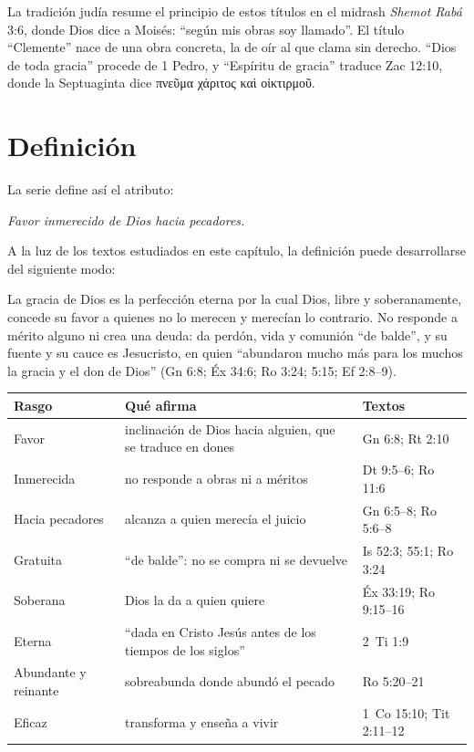 \documentclass[11pt,letterpaper]{article}
\newcommand{\grc}[1]{\foreignlanguage{ancientgreek}{#1}}
\begin{document}
\begin{nota}[Precisión]
La tradición judía resume el principio de estos títulos en el midrash \emph{Shemot Rabá} 3:6, donde Dios dice a Moisés: ``según mis obras soy llamado''. El título ``Clemente'' nace de una obra concreta, la de oír al que clama sin derecho. ``Dios de toda gracia'' procede de 1 Pedro, y ``Espíritu de gracia'' traduce Zac 12:10, donde la Septuaginta dice \grc{πνεῦμα χάριτος καὶ οἰκτιρμοῦ}.
\end{nota}

\section{Definición}

La serie define así el atributo:

\begin{tcolorbox}[colback=papiro,colframe=dorado,boxrule=1.2pt,arc=3pt]
\centering\large\itshape Favor inmerecido de Dios hacia pecadores.
\end{tcolorbox}

A la luz de los textos estudiados en este capítulo, la definición puede desarrollarse del siguiente modo:

\begin{tcolorbox}[colback=papiro,colframe=azul,boxrule=1pt,arc=3pt,fonttitle=\bfseries,title=Definición]
La gracia de Dios es la perfección eterna por la cual Dios, libre y soberanamente, concede su favor a quienes no lo merecen y merecían lo contrario. No responde a mérito alguno ni crea una deuda: da perdón, vida y comunión ``de balde'', y su fuente y su cauce es Jesucristo, en quien ``abundaron mucho más para los muchos la gracia y el don de Dios'' (Gn 6:8; Éx 34:6; Ro 3:24; 5:15; Ef 2:8--9).
\end{tcolorbox}

\begin{center}\small\renewcommand{\arraystretch}{1.2}
\begin{tabular}{@{}L{3.6cm}L{6.4cm}L{4.4cm}@{}}
\toprule
\textbf{Rasgo} & \textbf{Qué afirma} & \textbf{Textos} \\ \midrule
Favor & inclinación de Dios hacia alguien, que se traduce en dones & Gn 6:8; Rt 2:10 \\
Inmerecida & no responde a obras ni a méritos & Dt 9:5--6; Ro 11:6 \\
Hacia pecadores & alcanza a quien merecía el juicio & Gn 6:5--8; Ro 5:6--8 \\
Gratuita & ``de balde'': no se compra ni se devuelve & Is 52:3; 55:1; Ro 3:24 \\
Soberana & Dios la da a quien quiere & Éx 33:19; Ro 9:15--16 \\
Eterna & ``dada en Cristo Jesús antes de los tiempos de los siglos'' & 2~Ti 1:9 \\
Abundante y reinante & sobreabunda donde abundó el pecado & Ro 5:20--21 \\
Eficaz & transforma y enseña a vivir & 1~Co 15:10; Tit 2:11--12 \\
\bottomrule
\end{tabular}\end{center}
\end{document}
